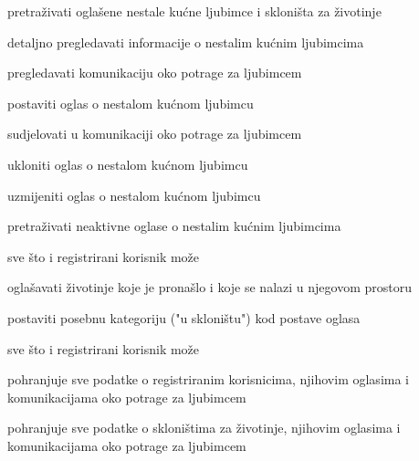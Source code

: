 			
			\begin{packed_enum}
				\item  {}
				
				\begin{packed_enum}
					
					\item pretraživati oglašene nestale kućne ljubimce i skloništa za životinje
					\item detaljno pregledavati informacije o nestalim kućnim ljubimcima
					\item  pregledavati komunikaciju oko potrage za ljubimcem
					
				\end{packed_enum}

                \item  {}
				
				\begin{packed_enum}
					
					\item postaviti oglas o nestalom kućnom ljubimcu
					\item sudjelovati u komunikaciji oko potrage za ljubimcem
					\item ukloniti oglas o nestalom kućnom ljubimcu
					\item uzmijeniti oglas o nestalom kućnom ljubimcu
					\item pretraživati neaktivne oglase o nestalim kućnim ljubimcima
					\item sve što i registrirani korisnik može
					
				\end{packed_enum}

                \item  {}
				
				\begin{packed_enum}
					
					\item oglašavati životinje koje je pronašlo i koje se nalazi u njegovom prostoru
					\item postaviti posebnu kategoriju ("u skloništu") kod postave oglasa
					\item sve što i registrirani korisnik može
					
				\end{packed_enum}
			
				\item  {}
				
				\begin{packed_enum}
					
					\item pohranjuje sve podatke o registriranim korisnicima, njihovim oglasima i komunikacijama oko potrage za ljubimcem
					\item pohranjuje sve podatke o skloništima za životinje, njihovim oglasima i komunikacijama oko potrage za ljubimcem
					
				\end{packed_enum}
			\end{packed_enum}
			
